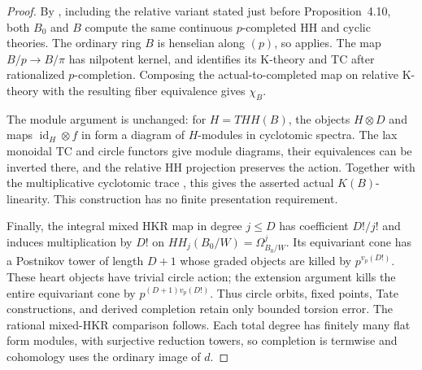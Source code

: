 \documentclass[11pt,a4paper]{article}
\theoremstyle{remark}
\begin{document}
\begin{proof}
By \cite[Proposition~4.2]{AMMN}, including the relative variant
stated just before Proposition~4.10, both $B_0$ and $B$ compute
the same continuous $p$-completed HH and cyclic theories.
The ordinary ring $B$ is henselian along $(p)$, so
\cite[Theorem~A]{AMMN} applies. The map $B/p\to B/\pi$ has
nilpotent kernel, and \cite[Corollary~3.8]{AMMN} identifies its
K-theory and TC after rationalized $p$-completion. Composing the
actual-to-completed map on relative K-theory with the resulting
fiber equivalence gives $\chi_B$.

The module argument is unchanged: for $H=THH(B)$, the objects
$H\otimes D$ and maps $\operatorname{id}_H\otimes f$ in
\cite[Proposition~2.8, Corollary~2.10, and Theorem~2.12]{AMMN}
form a diagram of $H$-modules in cyclotomic spectra.
The lax monoidal TC and circle functors give module diagrams,
their equivalences can be inverted there, and the relative HH
projection preserves the action. Together with the
multiplicative cyclotomic trace \cite[Theorem~7.4]{BGTTrace}, this gives the asserted actual
$K(B)$-linearity. This construction has no finite presentation
requirement.

Finally, the integral mixed HKR map
\cite[Definition~2.1, Remark~2.2 and Proposition~2.3]{BokstedtOttosen}
in degree $j\le D$ has
coefficient $D!/j!$ and induces multiplication by $D!$ on
$HH_j(B_0/W)=\Omega^j_{B_0/W}$. Its equivariant cone has a
Postnikov tower of length $D+1$ whose graded objects are killed
by $p^{v_p(D!)}$. These heart objects have trivial circle action;
the extension argument kills the entire equivariant cone by
$p^{(D+1)v_p(D!)}$. Thus circle orbits, fixed points, Tate
constructions, and derived completion retain only bounded
torsion error. The rational mixed-HKR comparison follows.
Each total degree has finitely many flat form modules, with
surjective reduction towers, so completion is termwise and
cohomology uses the ordinary image of $d$.
\end{proof}
\end{document}
